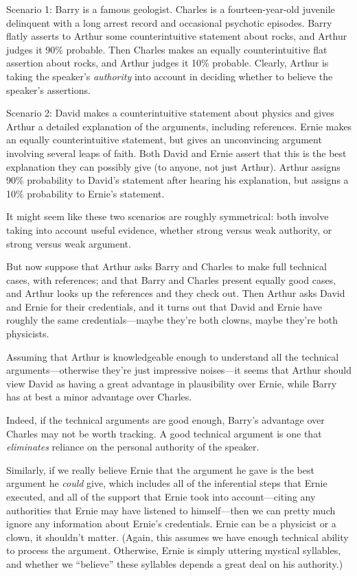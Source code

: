 \myendsectiontext


\bigskip


{
 Scenario 1: Barry is a famous geologist. Charles is a
fourteen-year-old juvenile delinquent with a long arrest record and
occasional psychotic episodes. Barry flatly asserts to Arthur some
counterintuitive statement about rocks, and Arthur judges it 90\%
probable. Then Charles makes an equally counterintuitive flat assertion
about rocks, and Arthur judges it 10\% probable. Clearly, Arthur is
taking the speaker's \textit{authority} into account in
deciding whether to believe the speaker's assertions. }

{
 Scenario 2: David makes a counterintuitive statement about physics
and gives Arthur a detailed explanation of the arguments, including
references. Ernie makes an equally counterintuitive statement, but
gives an unconvincing argument involving several leaps of faith. Both
David and Ernie assert that this is the best explanation they can
possibly give (to anyone, not just Arthur). Arthur assigns 90\%
probability to David's statement after hearing his
explanation, but assigns a 10\% probability to Ernie's
statement.}

{
 It might seem like these two scenarios are roughly symmetrical:
both involve taking into account useful evidence, whether strong versus
weak authority, or strong versus weak argument.}

{
 But now suppose that Arthur asks Barry and Charles to make full
technical cases, with references; and that Barry and Charles present
equally good cases, and Arthur looks up the references and they check
out. Then Arthur asks David and Ernie for their credentials, and it
turns out that David and Ernie have roughly the same
credentials---maybe they're both clowns, maybe
they're both physicists.}

{
 Assuming that Arthur is knowledgeable enough to understand all the
technical arguments---otherwise they're just impressive
noises---it seems that Arthur should view David as having a great
advantage in plausibility over Ernie, while Barry has at best a minor
advantage over Charles.}

{
 Indeed, if the technical arguments are good enough,
Barry's advantage over Charles may not be worth
tracking. A good technical argument is one that \textit{eliminates}
reliance on the personal authority of the speaker.}

{
 Similarly, if we really believe Ernie that the argument he gave is
the best argument he \textit{could} give, which includes all of the
inferential steps that Ernie executed, and all of the support that
Ernie took into account---citing any authorities that Ernie may have
listened to himself---then we can pretty much ignore any information
about Ernie's credentials. Ernie can be a physicist or
a clown, it shouldn't matter. (Again, this assumes we
have enough technical ability to process the argument. Otherwise, Ernie
is simply uttering mystical syllables, and whether we
``believe'' these syllables depends
a great deal on his authority.)}

